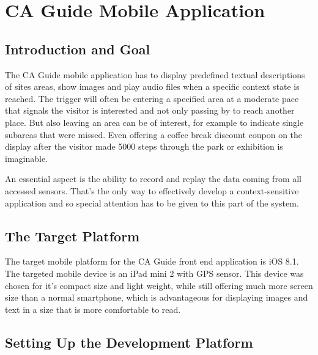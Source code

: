 
\chapter{CA Guide Mobile Application} %

\label{frontend} %



\section{Introduction and Goal}

The CA Guide mobile application has to display predefined textual descriptions of sites areas, show images and play audio files when a specific context state is reached. The trigger will often be entering a specified area at a moderate pace that signals the visitor is interested and not only passing by to reach another place. But also leaving an area can be of interest, for example to indicate single subareas that were missed. Even offering a coffee break discount coupon on the display after the visitor made 5000 steps through the park or exhibition is imaginable.

An essential aspect is the ability to record and replay the data coming from all accessed sensors. That's the only way to effectively develop a context-sensitive application and so special attention has to be given to this part of the system.

\section{The Target Platform}

The target mobile platform for the CA Guide front end application is iOS 8.1. The targeted mobile device is an iPad mini 2 with GPS sensor. This device was chosen for it's compact size and light weight, while still offering much more screen size than a normal smartphone, which is advantageous for displaying images and text in a size that is more comfortable to read.

\section{Setting Up the Development Platform}

